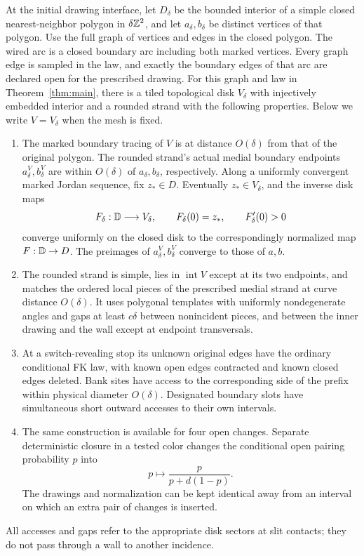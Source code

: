 \begin{lemma}\label{chordal:drawing}
At the initial drawing interface, let $D_\delta$ be the bounded
interior of a simple closed nearest-neighbor polygon in $\delta\mathbb Z^2$, and
let $a_\delta,b_\delta$ be distinct vertices of that polygon.
Use the full graph of vertices and edges in the closed polygon.
The wired arc is a closed boundary arc including both marked vertices.
Every graph edge is sampled in the law, and exactly the boundary edges of that arc are
declared open for the prescribed drawing.  For this graph and law
in Theorem~\ref{thm:main}, there is a tiled topological disk $V_\delta$
with injectively embedded interior and a rounded strand with the
following properties.  Below we write $V=V_\delta$ when the mesh is fixed.
\begin{enumerate}[label=(\roman*)]
\item The marked boundary tracing of $V$ is at distance $O(\delta)$
from that of the original polygon.  The rounded strand's actual
medial boundary endpoints $a_\delta^V,b_\delta^V$ are within
$O(\delta)$ of $a_\delta,b_\delta$, respectively.  Along a uniformly
convergent marked Jordan sequence, fix $z_*\in D$.  Eventually
$z_*\in V_\delta$, and the inverse disk maps
\[
 F_\delta:\mathbb D\longrightarrow V_\delta,\qquad
 F_\delta(0)=z_*,\qquad F_\delta'(0)>0
\]
converge uniformly on the closed disk to the correspondingly
normalized map $F:\mathbb D\to D$.  The preimages of
$a_\delta^V,b_\delta^V$ converge to those of $a,b$.
\item The rounded strand is simple, lies in $\operatorname{int}V$
except at its two endpoints, and matches the ordered local pieces
of the prescribed medial strand at curve distance $O(\delta)$.
It uses polygonal templates with uniformly nondegenerate angles
and gaps at least $c\delta$ between nonincident pieces, and between
the inner drawing and the wall except at endpoint transversals.
\item At a switch-revealing stop its unknown original edges have
the ordinary conditional FK law, with known open edges contracted
and known closed edges deleted.  Bank sites have access to the
corresponding side of the prefix within physical diameter $O(\delta)$.
Designated boundary slots have simultaneous short outward accesses
to their own intervals.
\item The same construction is available for four open changes.
Separate deterministic closure in a tested color changes the
conditional open pairing probability $p$ into
\begin{equation}\label{chordal:cap-odds}
 p\longmapsto\frac{p}{p+d(1-p)}.
\end{equation}
The drawings and normalization can be kept identical away from an
interval on which an extra pair of changes is inserted.
\end{enumerate}
All accesses and gaps refer to the appropriate disk sectors at slit
contacts; they do not pass through a wall to another incidence.
\end{lemma}

